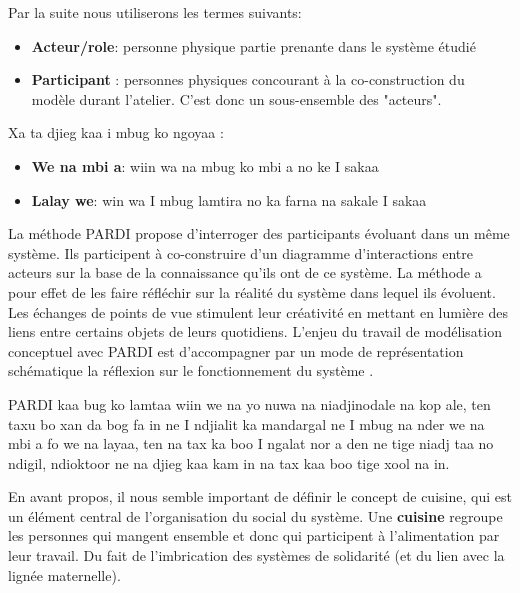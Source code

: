 \begin{paracol}{2}
  Par la suite nous utiliserons les termes suivants:
  \begin{itemize}
    \item \textbf{Acteur/role}: personne physique partie prenante dans le système étudié
    \item \textbf{Participant} : personnes physiques concourant à la co-construction du modèle durant l'atelier. C'est donc un sous-ensemble des "acteurs".
  \end{itemize}

  \switchcolumn %

  Xa ta djieg kaa i mbug ko ngoyaa :
  \begin{itemize}
    \item \textbf{We na mbi a}: wiin wa na mbug ko mbi a no ke I sakaa
    \item \textbf{Lalay we}: win wa I mbug lamtira no ka farna na sakale I sakaa
  \end{itemize}



\vspace{0.5cm}
  \switchcolumn %
  La méthode PARDI propose d'interroger des participants évoluant dans un même système. Ils participent à co-construire d'un diagramme d'interactions entre acteurs sur la base de la connaissance qu'ils ont de ce système. La méthode a pour effet de les faire réfléchir sur la réalité du système dans lequel ils évoluent. Les échanges de points de vue stimulent leur créativité en mettant en lumière des liens entre certains objets de leurs quotidiens. L'enjeu du travail de modélisation conceptuel avec PARDI est d'accompagner par un mode de représentation schématique la réflexion sur le fonctionnement du système \cite{becu_les_2010}.\\

  \switchcolumn %

  PARDI kaa bug ko lamtaa wiin we na yo nuwa na niadjinodale na kop ale, ten taxu bo xan da bog fa in ne I ndjialit ka mandargal ne I mbug na nder we na mbi a fo we na layaa, ten na tax ka boo I ngalat nor a den ne tige niadj taa no ndigil, ndioktoor ne na djieg kaa kam in na tax kaa boo tige xool na in.

  \switchcolumn %

  En avant propos, il nous semble important de définir le concept de cuisine, qui est un élément central de l'organisation du social du système. Une \textbf{cuisine} regroupe les personnes qui mangent ensemble et donc qui participent à l’alimentation par leur travail. Du fait de l’imbrication des systèmes de solidarité (et du lien avec la lignée maternelle).


\end{paracol}
